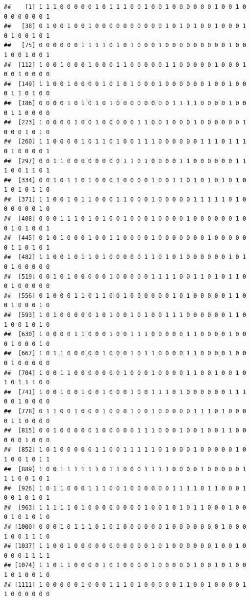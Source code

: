 \documentclass[
]{article}
\begin{document}
\begin{verbatim}
##    [1] 1 1 1 0 0 0 0 0 1 0 1 1 1 0 0 1 0 0 1 0 0 0 0 0 0 1 0 0 1 0 0 0 0 0 0 0 1
##   [38] 0 1 0 0 1 0 0 1 0 0 0 0 0 0 0 0 0 0 1 0 1 0 1 0 0 1 0 0 0 1 0 1 0 0 1 0 1
##   [75] 0 0 0 0 0 0 1 1 1 1 0 1 0 1 0 0 0 1 0 0 0 0 0 0 0 0 0 1 0 0 1 0 0 1 0 0 1
##  [112] 1 0 0 1 0 0 0 1 0 0 0 1 1 0 0 0 0 0 1 1 0 0 0 0 0 1 0 0 0 1 0 0 1 0 0 0 0
##  [149] 1 1 0 0 1 0 0 0 0 1 0 1 0 1 0 0 0 1 0 0 0 0 0 0 1 0 0 1 0 0 0 1 1 0 1 0 0
##  [186] 0 0 0 0 1 0 1 0 1 0 1 0 0 0 0 0 0 0 0 1 1 1 1 0 0 0 0 1 0 0 0 1 1 0 0 0 0
##  [223] 1 0 0 0 0 1 0 0 1 0 0 0 0 0 1 1 0 0 1 0 0 0 1 0 0 0 0 0 0 1 0 0 0 1 0 1 0
##  [260] 1 1 0 0 0 0 1 0 1 1 0 1 0 0 1 1 1 0 0 0 0 0 0 1 1 1 0 1 1 1 0 1 0 0 0 0 1
##  [297] 0 0 1 1 0 0 0 0 0 0 0 0 1 1 0 1 0 0 0 0 1 1 0 0 0 0 0 0 1 1 1 0 0 1 1 0 1
##  [334] 0 0 1 0 1 1 0 1 0 0 0 1 0 0 0 0 1 0 0 1 1 0 1 0 1 0 1 0 1 0 1 0 1 0 1 1 0
##  [371] 1 1 0 0 1 0 1 1 0 0 0 1 1 0 0 0 1 0 0 0 0 0 1 1 1 1 1 0 1 0 0 0 0 0 0 1 0
##  [408] 0 0 0 1 1 1 0 1 0 1 0 0 1 0 0 0 1 0 0 0 0 1 0 0 0 0 0 0 1 0 0 1 0 1 0 0 1
##  [445] 0 1 0 1 0 0 0 1 0 0 1 1 0 0 0 0 1 0 0 0 0 0 0 0 1 0 0 0 0 0 0 1 1 0 1 0 1
##  [482] 1 1 0 0 1 0 1 1 0 1 0 0 0 0 0 1 1 0 1 0 1 0 0 0 0 0 0 1 0 1 0 1 0 0 0 0 0
##  [519] 0 0 1 0 1 0 0 0 0 0 1 0 0 0 0 0 1 1 1 1 0 0 1 1 0 1 0 1 1 0 0 1 0 0 0 0 0
##  [556] 0 1 0 0 0 1 1 0 1 1 0 0 1 0 0 0 0 0 0 1 0 1 0 0 0 0 0 1 1 0 0 1 0 0 0 1 0
##  [593] 1 0 1 0 0 0 0 0 1 0 1 0 0 1 0 1 0 0 1 1 1 0 0 0 0 0 0 1 1 0 1 0 0 1 0 1 0
##  [630] 1 0 0 0 0 1 1 0 0 0 1 0 0 1 1 1 0 0 0 0 0 1 1 0 0 0 0 1 0 0 0 1 0 0 0 1 0
##  [667] 1 0 1 1 0 0 0 0 0 1 0 0 0 1 0 1 1 0 0 0 0 1 1 0 0 0 0 1 0 0 0 1 0 0 0 0 0
##  [704] 1 0 0 1 1 0 0 0 0 0 0 0 1 0 0 0 1 0 0 0 0 1 1 0 0 1 0 0 1 0 1 0 1 1 1 0 0
##  [741] 1 0 0 1 0 0 1 0 0 1 0 0 0 1 0 0 1 1 1 0 1 0 0 0 0 0 0 1 1 1 0 0 1 0 0 0 0
##  [778] 0 1 1 0 0 1 0 0 0 1 0 0 0 1 0 0 1 0 0 0 0 0 1 1 1 0 1 0 0 0 0 1 1 0 0 0 0
##  [815] 0 0 1 0 0 0 0 0 1 0 0 0 0 0 1 1 1 0 0 0 1 0 0 1 0 0 1 1 0 0 0 0 0 1 0 0 0
##  [852] 1 0 1 0 0 0 0 0 1 1 0 0 1 1 1 1 1 0 1 0 0 0 1 0 0 0 0 0 1 0 1 0 0 1 0 1 1
##  [889] 1 0 0 1 1 1 1 1 1 0 1 1 0 0 0 1 1 1 1 0 0 0 0 1 0 0 0 0 0 1 1 1 0 0 1 0 1
##  [926] 1 0 1 1 0 0 0 1 1 1 0 0 1 0 0 0 0 0 0 1 1 1 1 0 1 1 0 0 0 1 0 0 1 0 1 0 1
##  [963] 1 1 1 1 1 0 1 0 0 0 0 0 0 0 0 1 0 0 1 0 1 0 1 1 0 0 0 1 0 0 0 1 0 1 0 1 0
## [1000] 0 0 0 1 0 1 1 1 0 1 0 1 0 0 0 0 0 0 1 0 0 0 0 0 0 0 1 0 0 0 1 0 0 1 1 1 0
## [1037] 1 1 0 0 1 0 0 0 0 0 0 0 0 0 0 0 1 0 1 0 0 0 0 0 0 1 0 0 1 0 0 0 0 1 1 1 1
## [1074] 1 1 0 1 1 0 0 0 0 1 0 1 0 0 0 0 1 0 0 0 0 0 1 0 0 1 0 1 0 0 1 0 1 0 0 1 0
## [1111] 1 0 0 0 0 0 1 0 0 0 1 1 1 0 1 0 0 0 0 0 1 1 0 0 1 0 0 0 0 1 1 0 0 0 0 0 0

\end{verbatim}
\end{document}
